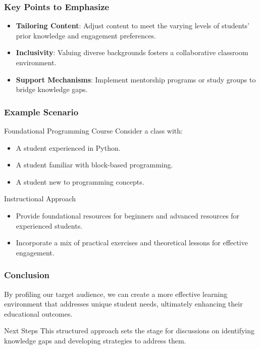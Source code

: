 \documentclass[aspectratio=169]{beamer}
\begin{document}
\begin{frame}[fragile]
  \frametitle{Key Points to Emphasize}
  \begin{itemize}
    \item \textbf{Tailoring Content}: Adjust content to meet the varying levels of students’ prior knowledge and engagement preferences.
    \item \textbf{Inclusivity}: Valuing diverse backgrounds fosters a collaborative classroom environment.
    \item \textbf{Support Mechanisms}: Implement mentorship programs or study groups to bridge knowledge gaps.
  \end{itemize}
\end{frame}

\begin{frame}[fragile]
  \frametitle{Example Scenario}
  \begin{block}{Foundational Programming Course}
    Consider a class with:
    \begin{itemize}
      \item A student experienced in Python.
      \item A student familiar with block-based programming.
      \item A student new to programming concepts.
    \end{itemize}
    \begin{block}{Instructional Approach}
      \begin{itemize}
        \item Provide foundational resources for beginners and advanced resources for experienced students.
        \item Incorporate a mix of practical exercises and theoretical lessons for effective engagement.
      \end{itemize}
    \end{block}
  \end{block}
\end{frame}

\begin{frame}[fragile]
  \frametitle{Conclusion}
  By profiling our target audience, we can create a more effective learning environment that addresses unique student needs, ultimately enhancing their educational outcomes.
  \begin{block}{Next Steps}
    This structured approach sets the stage for discussions on identifying knowledge gaps and developing strategies to address them.
  \end{block}
\end{frame}
\end{document}
